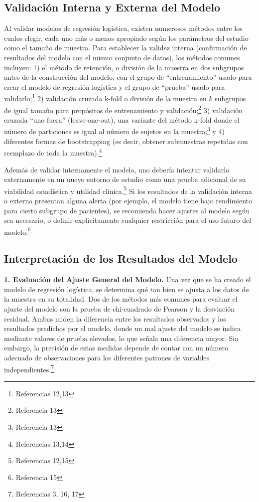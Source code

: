 \documentclass[12pt]{article}
\begin{document}
\subsection*{Validaci\'on Interna y Externa del Modelo}

Al validar modelos de regresi\'on log\'istica, existen numerosos m\'etodos entre los cuales elegir, cada uno m\'as o menos apropiado seg\'un los par\'ametros del estudio como el tama\~no de muestra. Para establecer la validez interna (confirmaci\'on de resultados del modelo con el mismo conjunto de datos), los m\'etodos comunes incluyen: 1) el m\'etodo de retenci\'on, o divisi\'on de la muestra en dos subgrupos antes de la construcci\'on del modelo, con el grupo de ``entrenamiento'' usado para crear el modelo de regresi\'on log\'istica y el grupo de ``prueba'' usado para validarlo;\footnote{Referencias 12,13} 2) validaci\'on cruzada k-fold o divisi\'on de la muestra en $k$ subgrupos de igual tama\~no para prop\'ositos de entrenamiento y validaci\'on;\footnote{Referencia 13} 3) validaci\'on cruzada ``uno fuera'' (leave-one-out), una variante del m\'etodo k-fold donde el n\'umero de particiones es igual al n\'umero de sujetos en la muestra;\footnote{Referencia 13} y 4) diferentes formas de bootstrapping (es decir, obtener submuestras repetidas con reemplazo de toda la muestra).\footnote{Referencias 13,14}

Adem\'as de validar internamente el modelo, uno deber\'ia intentar validarlo externamente en un nuevo entorno de estudio como una prueba adicional de su viabilidad estad\'istica y utilidad cl\'inica.\footnote{Referencias 12,15} Si los resultados de la validaci\'on interna o externa presentan alguna alerta (por ejemplo, el modelo tiene bajo rendimiento para cierto subgrupo de pacientes), se recomienda hacer ajustes al modelo seg\'un sea necesario, o definir expl\'icitamente cualquier restricci\'on para el uso futuro del modelo.\footnote{Referencia 15}

\subsection*{Interpretaci\'on de los Resultados del Modelo}

\textbf{1. Evaluaci\'on del Ajuste General del Modelo.} Una vez que se ha creado el modelo de regresi\'on log\'istica, se determina qu\'e tan bien se ajusta a los datos de la muestra en su totalidad. Dos de los m\'etodos m\'as comunes para evaluar el ajuste del modelo son la prueba de chi-cuadrado de Pearson y la desviaci\'on residual. Ambas miden la diferencia entre los resultados observados y los resultados predichos por el modelo, donde un mal ajuste del modelo se indica mediante valores de prueba elevados, lo que se\~nala una diferencia mayor. Sin embargo, la precisi\'on de estas medidas depende de contar con un n\'umero adecuado de observaciones para los diferentes patrones de variables independientes.\footnote{Referencias 3, 16, 17}
\end{document}
